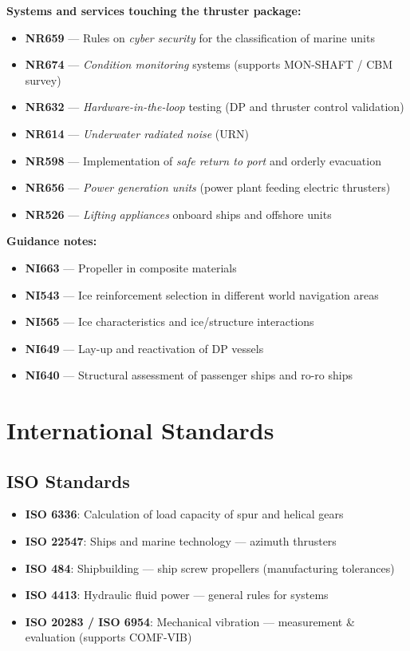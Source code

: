 \documentclass[11pt,a4paper]{report}
\begin{document}
\textbf{Systems and services touching the thruster package:}
\begin{itemize}[leftmargin=*]
\item \textbf{NR659} --- Rules on \emph{cyber security} for the classification of marine units
\item \textbf{NR674} --- \emph{Condition monitoring} systems (supports MON-SHAFT / CBM survey)
\item \textbf{NR632} --- \emph{Hardware-in-the-loop} testing (DP and thruster control validation)
\item \textbf{NR614} --- \emph{Underwater radiated noise} (URN)
\item \textbf{NR598} --- Implementation of \emph{safe return to port} and orderly evacuation
\item \textbf{NR656} --- \emph{Power generation units} (power plant feeding electric thrusters)
\item \textbf{NR526} --- \emph{Lifting appliances} onboard ships and offshore units
\end{itemize}

\textbf{Guidance notes:}
\begin{itemize}[leftmargin=*]
\item \textbf{NI663} --- Propeller in composite materials
\item \textbf{NI543} --- Ice reinforcement selection in different world navigation areas
\item \textbf{NI565} --- Ice characteristics and ice/structure interactions
\item \textbf{NI649} --- Lay-up and reactivation of DP vessels
\item \textbf{NI640} --- Structural assessment of passenger ships and ro-ro ships
\end{itemize}

\section{International Standards}

\subsection{ISO Standards}
\begin{itemize}[leftmargin=*]
\item \textbf{ISO 6336}: Calculation of load capacity of spur and helical gears
\item \textbf{ISO 22547}: Ships and marine technology --- azimuth thrusters
\item \textbf{ISO 484}: Shipbuilding --- ship screw propellers (manufacturing tolerances)
\item \textbf{ISO 4413}: Hydraulic fluid power --- general rules for systems
\item \textbf{ISO 20283 / ISO 6954}: Mechanical vibration --- measurement \& evaluation (supports COMF-VIB)
\end{itemize}
\end{document}
